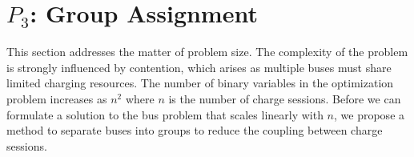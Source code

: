 \section{$P_3$: Group Assignment\label{sec:groupAssignment}}
This section addresses the matter of problem size.  The complexity of the problem is strongly influenced by contention, which arises as multiple buses must share limited charging resources.  The number of binary variables in the optimization problem increases as $n^2$ where $n$ is the number of charge sessions.
Before we can formulate a solution to the bus problem that scales linearly with $n$, we propose a method to separate buses into groups to reduce the coupling between charge sessions.

